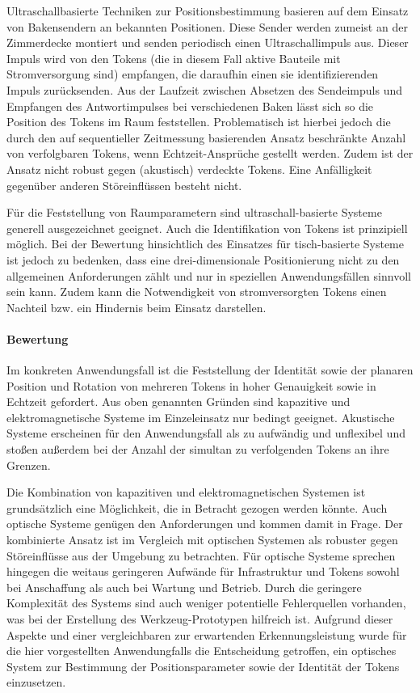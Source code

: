 Ultraschallbasierte Techniken zur Positionsbestimmung basieren auf dem Einsatz von Bakensendern an bekannten Positionen. Diese Sender werden zumeist an der Zimmerdecke montiert und senden periodisch einen Ultraschallimpuls aus. Dieser Impuls wird von den Tokens (die in diesem Fall aktive Bauteile mit Stromversorgung sind) empfangen, die daraufhin einen sie identifizierenden Impuls zurücksenden. Aus der Laufzeit zwischen Absetzen des Sendeimpuls und Empfangen des Antwortimpulses bei verschiedenen Baken lässt sich so die Position des Tokens im Raum feststellen. Problematisch ist hierbei jedoch die durch den auf sequentieller Zeitmessung basierenden Ansatz beschränkte Anzahl von verfolgbaren Tokens, wenn Echtzeit-Ansprüche gestellt werden. Zudem ist der Ansatz nicht robust gegen (akustisch) verdeckte Tokens. Eine Anfälligkeit gegenüber anderen Störeinflüssen besteht nicht. 

Für die Feststellung von Raumparametern sind ultraschall-basierte Systeme generell ausgezeichnet geeignet. Auch die Identifikation von Tokens ist prinzipiell möglich. Bei der Bewertung hinsichtlich des Einsatzes für tisch-basierte Systeme ist jedoch zu bedenken, dass eine drei-dimensionale Positionierung nicht zu den allgemeinen Anforderungen zählt und nur in speziellen Anwendungsfällen sinnvoll sein kann. Zudem kann die Notwendigkeit von stromversorgten Tokens einen Nachteil bzw. ein Hindernis beim Einsatz darstellen.


\paragraph{Bewertung} %
\label{par:bewertung}

Im konkreten Anwendungsfall ist die Feststellung der Identität sowie der planaren Position und Rotation von mehreren Tokens in hoher Genauigkeit sowie in Echtzeit gefordert. Aus oben genannten Gründen sind kapazitive und elektromagnetische Systeme im Einzeleinsatz nur bedingt geeignet. Akustische Systeme erscheinen für den Anwendungsfall als zu aufwändig und unflexibel und stoßen außerdem bei der Anzahl der simultan zu verfolgenden Tokens an ihre Grenzen.

Die Kombination von kapazitiven und elektromagnetischen Systemen ist grundsätzlich eine Möglichkeit, die in Betracht gezogen werden könnte. Auch optische Systeme genügen den Anforderungen und kommen damit in Frage. Der kombinierte Ansatz ist im Vergleich mit optischen Systemen als robuster gegen Störeinflüsse aus der Umgebung zu betrachten. Für optische Systeme sprechen hingegen die weitaus geringeren Aufwände für Infrastruktur und Tokens sowohl bei Anschaffung als auch bei Wartung und Betrieb. Durch die geringere Komplexität des Systems sind auch weniger potentielle Fehlerquellen vorhanden, was bei der Erstellung des Werkzeug-Prototypen hilfreich ist. Aufgrund dieser Aspekte und einer vergleichbaren zur erwartenden Erkennungsleistung wurde für die hier vorgestellten Anwendungfalls die Entscheidung getroffen, ein optisches System zur Bestimmung der Positionsparameter sowie der Identität der Tokens einzusetzen.

